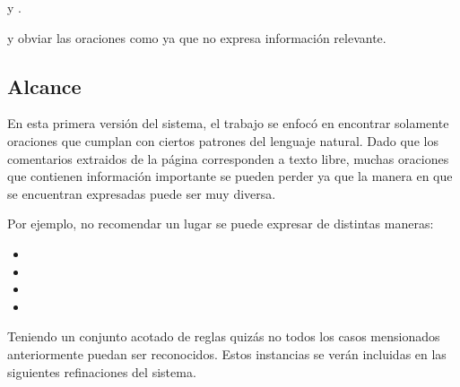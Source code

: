  y .

y obviar las oraciones como  ya que no expresa información relevante.


\subsection{Alcance}

En esta primera versión del sistema, el trabajo se enfocó en encontrar solamente oraciones que cumplan con ciertos patrones del lenguaje natural. Dado que los comentarios extraidos de la página corresponden a texto libre, muchas oraciones que contienen información importante se pueden perder ya que la manera en que se encuentran expresadas puede ser muy diversa.

Por ejemplo, no recomendar un lugar se puede expresar de distintas maneras:
\begin{itemize}
\item {}
\item {}
\item {}
\item {}
\end{itemize}

Teniendo un conjunto acotado de reglas quizás no todos los casos mensionados anteriormente puedan ser reconocidos. Estos instancias se verán incluidas en las siguientes refinaciones del sistema.




